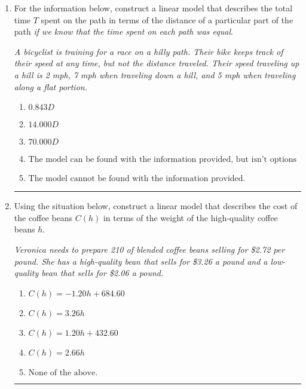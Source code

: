 \documentclass[14pt]{extbook}
\newcommand{\litem}[1]{\item#1\hspace*{-1cm}\rule{\textwidth}{0.4pt}}
\begin{document}
\begin{enumerate}
{\begin{enumerate}[label=\Alph*.]
\end{enumerate} }
\litem{
For the information below, construct a linear model that describes the total time $T$ spent on the path in terms of the distance of a particular part of the path \textit{if we know that the time spent on each path was equal}.
\begin{center}
    \textit{ A bicyclist is training for a race on a hilly path. Their bike keeps track of their speed at any time, but not the distance traveled. Their speed traveling up a hill is 2 mph, 7 mph when traveling down a hill, and 5 mph when traveling along a flat portion. }
\end{center}
\begin{enumerate}[label=\Alph*.]
\item \( 0.843 D \)
\item \( 14.000 D \)
\item \( 70.000 D \)
\item \( \text{The model can be found with the information provided, but isn't options 1-3.} \)
\item \( \text{The model cannot be found with the information provided.} \)

\end{enumerate} }
\litem{
Using the situation below, construct a linear model that describes the cost of the coffee beans $C(h)$ in terms of the weight of the high-quality coffee beans $h$.
\begin{center}
    \textit{ Veronica needs to prepare 210 of blended coffee beans selling for \$2.72 per pound. She has a high-quality bean that sells for \$3.26 a pound and a low-quality bean that sells for \$2.06 a pound. }
\end{center}
\begin{enumerate}[label=\Alph*.]
\item \( C(h) = -1.20 h + 684.60 \)
\item \( C(h) = 3.26 h \)
\item \( C(h) = 1.20 h + 432.60 \)
\item \( C(h) = 2.66 h \)
\item \( \text{None of the above.} \)


\end{enumerate}}
\end{enumerate}
\end{document}
